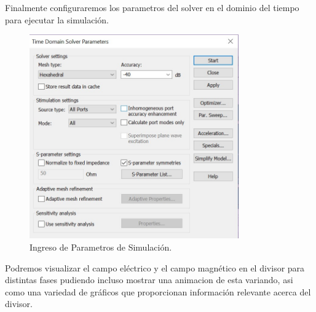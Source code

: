 \documentclass[a4paper]{IEEEtran} %
\begin{document}
Finalmente configuraremos los parametros del solver en el dominio del tiempo para ejecutar la simulación.
\begin{figure}[h]    
    \centering
    \includegraphics[width=9cm]{imagenes/img12}
    \caption{Ingreso de Parametros de Simulación.}
    \label{fig:modelamiento7}
\end{figure}

Podremos visualizar el campo eléctrico y el campo magnético en el divisor para distintas fases pudiendo incluso mostrar una animacion de esta variando, asi como una variedad de gráficos que proporcionan información relevante acerca del divisor.
\end{document}
